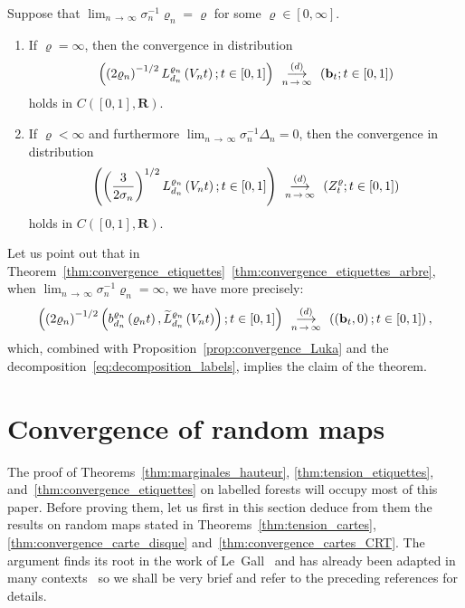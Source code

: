\documentclass[AHL,Unicode,longabstracts,published]{cedram}
\newcommand{\ensembles}[1]{\mathbf{#1}}
\newcommand{\R}{\ensembles{R}}
\newcommand{\1}{\ensembles{1}}
\newcommand{\tildep}[1]{\widetilde{#1}\vphantom{#1}}
\newcommand{\bb}{\mathbf{b}}
\newcommand{\Cmap}{C}
\newcommand{\Lfn}{L_{d_n}^{\varrho_n}}
\newcommand{\tLfn}{\tildep{L}_{d_n}^{\varrho_n}}
\newcommand{\bfn}{b_{d_n}^{\varrho_n}}
\newcommand{\vertices}{V}
\newcommand{\cvloi}[1][n]{\enskip\mathop{\longrightarrow}^{(d)}_{#1\,\to\, \infty}\enskip}
\begin{document}
\begin{theo}\label{thm:convergence_etiquettes}
Suppose that $\lim_{n\,\to\,\infty} \sigma_n^{-1} \varrho_n = \varrho$ for some $\varrho \in [0,\infty]$.
\begin{enumerate}
\item\label{thm:convergence_etiquettes_arbre}
If $\varrho = \infty$, then the convergence in distribution
\[
\left(\left(2\varrho_n\right)^{-1/2} \Lfn\left(\vertices_n t\right); t \in [0,1]\right) \cvloi \left(\bb_t; t \in [0,1]\right)
\]
holds in $\Cmap([0,1],\R)$.

\item\label{thm:convergence_etiquettes_carte_disque}
If $\varrho < \infty$ and furthermore $\lim_{n\,\to\,\infty} \sigma_n^{-1} \Delta_n = 0$, then the convergence in distribution
\[
\left(\left(\frac{3}{2\sigma_n}\right)^{1/2} \Lfn\left(\vertices_n t\right) ; t \in [0,1]\right) \cvloi \left(Z^\varrho_t; t \in [0,1]\right)
\]
holds in $\Cmap([0,1],\R)$.
\end{enumerate}
\end{theo}

Let us point out that in Theorem~\ref{thm:convergence_etiquettes}~\eqref{thm:convergence_etiquettes_arbre}, when $\lim_{n\,\to\,\infty} \sigma_n^{-1} \varrho_n = \infty$, we have more precisely:
\[
\left(\left(2\varrho_n\right)^{-1/2} \left(\bfn\left(\varrho_n t\right), \tLfn\left(\vertices_n t\right)\right); t \in [0,1]\right) \cvloi \left(\left(\bb_t, 0\right); t \in [0,1]\right),
\]
which, combined with Proposition~\ref{prop:convergence_Luka} and the decomposition~\eqref{eq:decomposition_labels}, implies the claim of the theorem.



\section{Convergence of random maps}\label{sec:convergence_cartes}

The proof of Theorems~\ref{thm:marginales_hauteur}, \ref{thm:tension_etiquettes}, and~\ref{thm:convergence_etiquettes} on labelled forests will occupy most of this paper. Before proving them, let us first in this section deduce from them the results on random maps stated in Theorems~\ref{thm:tension_cartes}, \ref{thm:convergence_carte_disque} and~\ref{thm:convergence_cartes_CRT}. The argument finds its root in the work of Le~Gall~\cite{LG13} and has already been adapted in many contexts~\cite{ABA17,ABA21,Abr16,BJM14,BM17,LG13,Mar18a,Mar18b} so we shall be very brief and refer to the preceding references for details.
\end{document}
